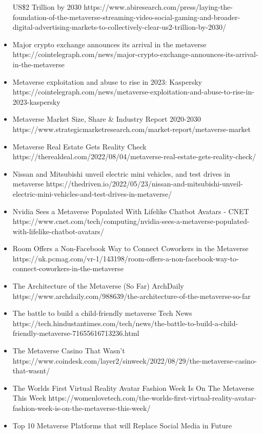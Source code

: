 \begin{itemize}
  US\$2 Trillion by 2030
  https://www.abiresearch.com/press/laying-the-foundation-of-the-metaverse-streaming-video-social-gaming-and-broader-digital-advertising-markets-to-collectively-clear-us2-trillion-by-2030/
\item
  Major crypto exchange announces its arrival in the metaverse
  https://cointelegraph.com/news/major-crypto-exchange-announces-its-arrival-in-the-metaverse
\item
  Metaverse exploitation and abuse to rise in 2023: Kaspersky
  https://cointelegraph.com/news/metaverse-exploitation-and-abuse-to-rise-in-2023-kaspersky
\item
  Metaverse Market Size, Share \& Industry Report 2020-2030
  https://www.strategicmarketresearch.com/market-report/metaverse-market
\item
  Metaverse Real Estate Gets Reality Check
  https://therealdeal.com/2022/08/04/metaverse-real-estate-gets-reality-check/
\item
  Nissan and Mitsubishi unveil electric mini vehicles, and test drives
  in metaverse
  https://thedriven.io/2022/05/23/nissan-and-mitsubishi-unveil-electric-mini-vehicles-and-test-drives-in-metaverse/
\item
  Nvidia Sees a Metaverse Populated With Lifelike Chatbot Avatars - CNET
  https://www.cnet.com/tech/computing/nvidia-sees-a-metaverse-populated-with-lifelike-chatbot-avatars/
\item
  Room\textquotesingle{} Offers a Non-Facebook Way to Connect Coworkers
  in the Metaverse
  https://uk.pcmag.com/vr-1/143198/room-offers-a-non-facebook-way-to-connect-coworkers-in-the-metaverse
\item
  The Architecture of the Metaverse (So Far) \textbar{} ArchDaily
  https://www.archdaily.com/988639/the-architecture-of-the-metaverse-so-far
\item
  The battle to build a child-friendly metaverse \textbar{} Tech News
  https://tech.hindustantimes.com/tech/news/the-battle-to-build-a-child-friendly-metaverse-71655616713236.html
\item
  The Metaverse Casino That Wasn't
  https://www.coindesk.com/layer2/sinweek/2022/08/29/the-metaverse-casino-that-wasnt/
\item
  The World\textquotesingle s First Virtual Reality Avatar Fashion Week
  Is On The Metaverse This Week
  https://womenlovetech.com/the-worlds-first-virtual-reality-avatar-fashion-week-is-on-the-metaverse-this-week/
\item
  Top 10 Metaverse Platforms that will Replace Social Media in Future

\end{itemize}
